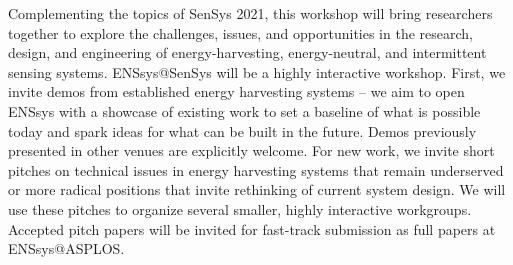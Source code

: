 \documentclass[a4paper,10pt]{scrartcl}
\begin{document}
\renewcommand{\baselinestretch}{1.05} 



\vspace{-7.5em}

\vspace{-1em}
Complementing the topics of SenSys 2021, this workshop will bring researchers
together to explore the challenges, issues, and opportunities in the research,
design, and engineering of energy-harvesting, energy-neutral, and intermittent
sensing systems.
%
%
%
%
ENSsys@SenSys will be a highly interactive workshop.
%
First, we invite demos from established energy
harvesting systems -- we aim to open ENSsys with a showcase of existing work
to set a baseline of what is possible today and spark ideas for what can be
built in the future.
%
Demos previously presented in other venues are explicitly welcome.
%
For new work, we invite short pitches on technical issues in energy harvesting
systems that remain underserved or more radical positions that invite rethinking of
current system design.
%
We will use these pitches to organize several smaller, highly interactive
workgroups.
%
Accepted pitch papers will be invited for fast-track submission as full papers at ENSsys@ASPLOS.
\end{document}

